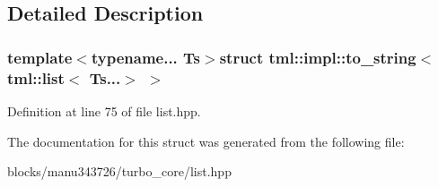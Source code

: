 \subsection{Detailed Description}
\subsubsection*{template$<$typename... Ts$>$struct tml\+::impl\+::to\+\_\+string$<$ tml\+::list$<$ Ts...$>$ $>$}



Definition at line 75 of file list.\+hpp.



The documentation for this struct was generated from the following file\+:\begin{DoxyCompactItemize}
\item 
blocks/manu343726/turbo\+\_\+core/list.\+hpp\end{DoxyCompactItemize}
